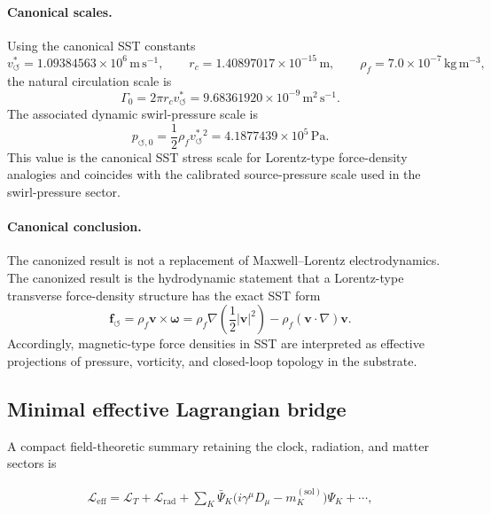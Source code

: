 \documentclass[11pt]{article}
\theoremstyle{definition}
\theoremstyle{plain}
\theoremstyle{remark}
\newcommand{\rhoF}{{\rho_{\!f}}}
\newcommand{\rc}{{r_c}}
\newcommand{\vchar}{v_{\!\boldsymbol{\circlearrowleft}}^{\ast}}
\begin{document}
        \paragraph{Canonical scales.}
        Using the canonical SST constants
        \[
        \vchar
        =
        1.09384563\times10^6\,\mathrm{m\,s^{-1}},
        \qquad
        \rc
        =
        1.40897017\times10^{-15}\,\mathrm m,
        \qquad
        \rhoF
        =
        7.0\times10^{-7}\,\mathrm{kg\,m^{-3}},
        \]
        the natural circulation scale is
        \[
        \Gamma_0
        =
        2\pi \rc\vchar
        =
        9.68361920\times10^{-9}\,\mathrm{m^2\,s^{-1}}.
        \]
        The associated dynamic swirl-pressure scale is
        \[
        p_{\circlearrowleft,0}
        =
        \frac12\rhoF\vchar{}^2
        =
        4.1877439\times10^{5}\,\mathrm{Pa}.
        \]
        This value is the canonical SST stress scale for Lorentz-type
        force-density analogies and coincides with the calibrated source-pressure
        scale used in the swirl-pressure sector.

        \paragraph{Canonical conclusion.}
        The canonized result is not a replacement of Maxwell--Lorentz electrodynamics.
        The canonized result is the hydrodynamic statement that a Lorentz-type
        transverse force-density structure has the exact SST form
        \[
        \boxed{
        \mathbf f_{\circlearrowleft}
        =
        \rhoF\mathbf v\times\boldsymbol{\omega}
        =
        \rhoF
        \nabla\!\left(\frac12|\mathbf v|^2\right)
        -
        \rhoF(\mathbf v\cdot\nabla)\mathbf v .
        }
        \]
        Accordingly, magnetic-type force densities in SST are interpreted as
        effective projections of pressure, vorticity, and closed-loop topology in the
        substrate.

    \subsection{Minimal effective Lagrangian bridge}

        A compact field-theoretic summary retaining the clock, radiation, and matter sectors is

        \begin{align}
            \mathcal{L}_{\mathrm{eff}}
            =
            \mathcal{L}_{T}
            +
            \mathcal{L}_{\mathrm{rad}}
            +
            \sum_K \bar\Psi_K\bigl(i\gamma^\mu D_\mu - m_K^{(\mathrm{sol})}\bigr)\Psi_K
            + \cdots,
            \label{eq:minimal_effective_lagrangian_bridge}
        \end{align}
\end{document}

